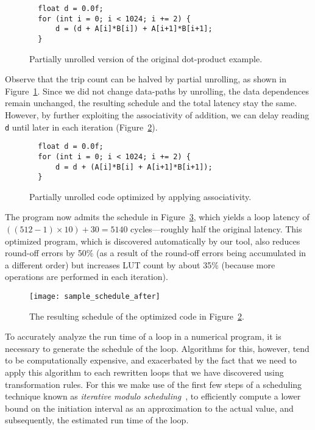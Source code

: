 \begin{figure}[ht]
\begin{lstlisting}
  float d = 0.0f;
  for (int i = 0; i < 1024; i += 2) {
      d = (d + A[i]*B[i]) + A[i+1]*B[i+1];
  }
\end{lstlisting}
    \caption{Partially unrolled version of the original dot-product example.}
    \label{bg:fig:dotprod_unroll}
\end{figure}
Observe that the trip count can be halved by partial unrolling, as shown in
Figure~\ref{bg:fig:dotprod_unroll}.  Since we did not change data-paths by
unrolling, the data dependences remain unchanged, the resulting schedule
and the total latency stay the same.  However, by further exploiting the
associativity of addition, we can delay reading \verb|d| until later in each
iteration (Figure~\ref{bg:fig:dotprod_optimized}).
\begin{figure}[ht]
\begin{lstlisting}
  float d = 0.0f;
  for (int i = 0; i < 1024; i += 2) {
      d = d + (A[i]*B[i] + A[i+1]*B[i+1]);
  }
\end{lstlisting}
    \caption{Partially unrolled code optimized by applying associativity.}
    \label{bg:fig:dotprod_optimized}
\end{figure}

The program now admits the schedule in
Figure~\ref{bg:fig:sample_schedule_after}, which yields a loop latency
of $((512-1)\times 10) + 30 = 5140$ cycles---roughly half the original
latency. This optimized program, which is discovered automatically by our tool,
also reduces round-off errors by 50\% (as a result of the round-off errors
being accumulated in a different order) but increases LUT count by about 35\%
(because more operations are performed in each iteration).

\begin{figure}[ht]
    \centering
    \texttt{[image: sample\_schedule\_after]}
    \caption{%
        The resulting schedule of the optimized code in
        Figure~\ref{bg:fig:dotprod_optimized}.}
    \label{bg:fig:sample_schedule_after}
\end{figure}

To accurately analyze the run time of a loop in a numerical program, it is
necessary to generate the schedule of the loop.  Algorithms for this, however,
tend to be computationally expensive, and exacerbated by the fact that we
need to apply this algorithm to each rewritten loops that we have discovered
using transformation rules.  For this we make use of the first few steps of a
scheduling technique known as \emph{iterative modulo scheduling}~\cite{rau94},
to efficiently compute a lower bound on the initiation interval as an
approximation to the actual value, and subsequently, the estimated run time of
the loop.
